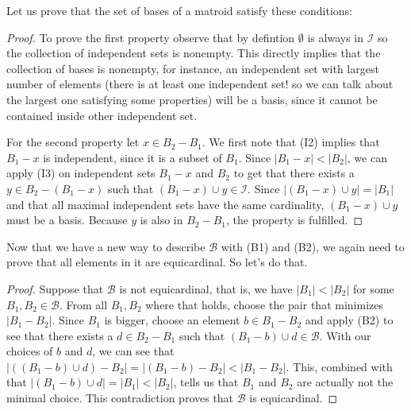 Let us prove that the set of bases of a matroid satisfy these conditions:
\begin{proof}
    To prove the first property observe that by defintion $\emptyset$ is always in $\mathcal{I}$ so the collection of independent sets is nonempty. This directly implies that the collection of bases is nonempty, for instance, an independent set with largest number of elements (there is at least one independent set! so we can talk about the largest one satisfying some properties) will be a basis, since it cannot be contained inside other independent set.
    
    
    For the second property let $x\in B_2 - B_1$. We first note that (I2) implies that $B_1 - x$ is independent, since it is a subset of $B_1$. Since $|B_1-x|<|B_2|$, we can apply (I3) on independent sets $B_1-x$ and $B_2$ to get that there exists a $y\in B_2-(B_1-x)$ such that $(B_1-x)\cup y \in\mathcal{I}$. Since $|(B_1-x)\cup y|=|B_1|$ and that all maximal independent sets have the same cardinality, $(B_1-x)\cup y$ must be a basis. Because $y$ is also in $B_2-B_1$, the property is fulfilled.    
\end{proof} 
Now that we have a new way to describe $\mathcal{B}$ with (B1) and (B2), we again need to prove that all elements in it are equicardinal. So let's do that.
\begin{proof}
    Suppose that $\mathcal{B}$ is not equicardinal, that is, we have $|B_1|<|B_2|$ for some $B_1,B_2\in\mathcal{B}$. From all $B_1,B_2$ where that holds, choose the pair that minimizes $|B_1-B_2|$. Since $B_1$ is bigger, choose an element $b\in B_1-B_2$ and apply (B2) to see that there exists a $d\in B_2-B_1$ such that $(B_1-b)\cup d \in\mathcal{B}$. With our choices of $b$ and $d$, we can see that $|((B_1-b)\cup d)-B_2|=|(B_1-b)-B_2|<|B_1-B_2|$. This, combined with that $|(B_1-b)\cup d|=|B_1|<|B_2|$, tells us that $B_1$ and $B_2$ are actually not the minimal choice. This contradiction proves that $\mathcal{B}$ is equicardinal.
\end{proof}

